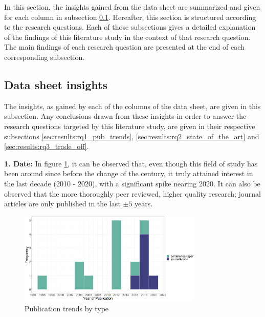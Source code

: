 \vspace{2mm}

In this section, the insights gained from the data sheet are summarized and given for each column in subsection \ref{sec:results:insights}.
Hereafter, this section is structured according to the research questions.
Each of those subsections gives a detailed explanation of the findings of this literature study in the context of that research question.
The main findings of each research question are presented at the end of each corresponding subsection.


\subsection{Data sheet insights}
\label{sec:results:insights}
The insights, as gained by each of the columns of the data sheet, are given in this subsection.
Any conclusions drawn from these insights in order to answer the research questions targeted by this literature study,
are given in their respective subsections \ref{sec:results:rq1_pub_trends}, \ref{sec:results:rq2_state_of_the_art} and \ref{sec:results:rq3_trade_off}.

\vspace{5mm}

\noindent\textbf{1. Date:}
In figure \ref{fig:pub_trends}, it can be observed that, even though this field of study has been around since before the change of the century,
it truly attained interest in the last decade (2010 - 2020), with a significant spike nearing 2020.
It can also be observed that the more thoroughly peer reviewed, higher quality research; journal articles are only published in the last $\pm 5$ years.

\begin{figure}[t]
    \includegraphics[width=250pt]{figures/publication_trend_extended.png}
    \caption{Publication trends by type}
    \label{fig:pub_trends}
\end{figure}

